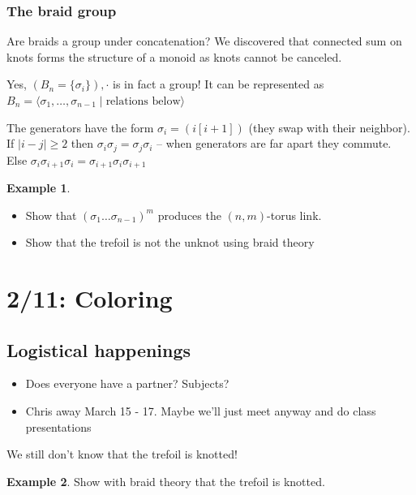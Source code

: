\documentclass[11pt]{article}
\newcommand{\set}[1]{\{ #1 \}}
\newcommand{\abs}[1]{\left| #1 \right|}
\theoremstyle{plain}
\theoremstyle{definition}
\newtheorem{ex}{Example}
\begin{document}
\subsubsection{The braid group}

Are braids a group under concatenation? We discovered that connected sum on knots forms the structure of a monoid as knots cannot be canceled.

Yes, $(B_n = \set{\sigma_i}), \cdot$ is in fact a group! It can be represented as $B_n = \langle\sigma_1, \ldots, \sigma_{n-1}\; |\; \text{relations below}\rangle$

The generators have the form $\sigma_i = (i [i + 1])$ (they swap with their neighbor). If $\abs{i - j} \geq 2$ then $\sigma_i \sigma_j = \sigma_j \sigma_i$ -- when generators are far apart they commute.
Else $\sigma_i \sigma_{i +1} \sigma_i = \sigma_{i + 1} \sigma_i \sigma_{i + 1}$


\begin{ex}

  \begin{itemize}
    \item Show that $(\sigma_1 \dots \sigma_{n - 1})^m$ produces the $(n, m)$-torus link.
    \item Show that the trefoil is not the unknot using braid theory
  \end{itemize}

\end{ex}



\clearpage
\section{2/11: Coloring}

\subsection{Logistical happenings}


\begin{itemize}
\item Does everyone have a partner? Subjects?
\item Chris away March 15 - 17. Maybe we'll just meet anyway and do class presentations
\end{itemize}


We still don't know that the trefoil is knotted!


\begin{ex}
  Show with braid theory that the trefoil is knotted.
\end{ex}
\end{document}
